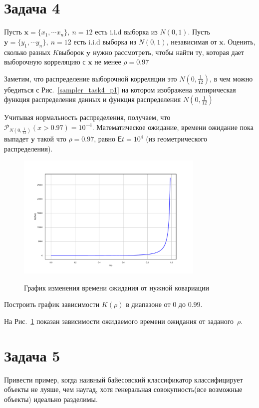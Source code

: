 \documentclass[12pt, twoside]{article}
\newcommand{\Pb}{\mathcal{P}}
\begin{document}
\section{Задача 4}
Пусть $\textbf{x} = \{x_1, \cdots x_n\},~n=12$ есть i.i.d выборка из $N(0,1)$. Пусть $\textbf{y} = \{y_1, \cdots y_n\},~n=12$ есть i.i.d выборка из $N(0,1)$, независимая от $\textbf{x}$. Оценить, сколько разных $K$выборок $\textbf{y}$ нужно рассмотреть, чтобы найти ту, которая дает выборочную корреляцию с $\textbf{x}$ не менее $\rho = 0.97$

Заметим, что распределение выборочной корреляции это $N(0, \frac{1}{12})$, в чем можно убедиться с Рис.~\ref{sampler_task4_p1} на котором изображена эмпирическая функция распределения данных и функция распределения $N(0, \frac{1}{12})$

Учитывая нормальность распределения, получаем, что $\Pb_{N(0, \frac{1}{12})}(x > 0.97) = 10^{-4}$. Математическое ожидание, времени ожидание пока выпадет $\textbf{y}$ такой что $\rho = 0.97$, равно $\mathsf{E}t = 10^4$ (из геометрического распределения).



\begin{figure}[h!]\center
{\includegraphics[width=0.8\textwidth]{sampler_task4_p2}}
\caption{График изменения времени ожидания от нужной ковариации}
\label{sampler_task4_p2}
\end{figure}

Построить график зависимости $K(\rho)$ в диапазоне от $0$ до $0.99$.

На Рис.~\ref{sampler_task4_p2} показан зависимости ожидаемого времени ожидания от заданого~$\rho$. 


\section{Задача 5}
Привести пример, когда наивный байесовский классификатор классифицирует объекты не луяше, чем наугад, хотя генеральная совокупность(все возможные объекты) идеально разделимы.
\end{document}
